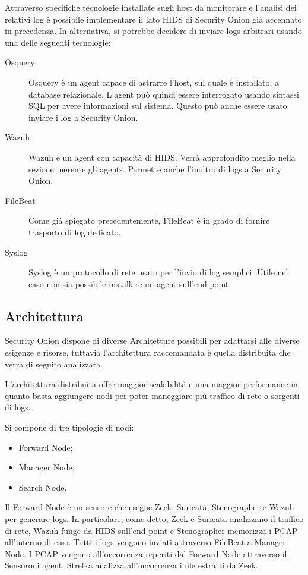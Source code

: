 Attraverso specifiche tecnologie installate sugli host da monitorare e l'analisi dei relativi log è possibile implementare il lato HIDS di Security Onion già accennato in precedenza.
In alternativa, si potrebbe decidere di inviare logs arbitrari usando una delle seguenti tecnologie:
\begin{description}
    \item[Osquery] Osquery \cite{osquery} è un agent  capace di astrarre l'host, sul quale è installato, a database relazionale. L'agent può quindi essere interrogato usando sintassi SQL per avere informazioni sul sistema. Questo può anche essere usato inviare i log a Security Onion.
    \item[Wazuh] Wazuh \cite{wazuh} è un agent con capacità di HIDS. Verrà approfondito meglio nella sezione inerente gli agents. Permette anche l'inoltro di logs a Security Onion.
    \item[FileBeat] Come già spiegato precedentemente, FileBeat \cite{filebeat} è in grado di fornire trasporto di log dedicato.
    \item [Syslog] Syslog \cite{syslog} è un protocollo di rete usato per l'invio di log semplici. Utile nel caso non sia possibile installare un agent sull'end-point.
\end{description}

\subsection{Architettura}
Security Onion dispone di diverse Architetture possibili per adattarsi alle diverse esigenze e risorse, tuttavia l'architettura raccomandata è quella distribuita che verrà di seguito analizzata.

L'architettura distribuita offre maggior scalabilità e una maggior performance in quanto basta aggiungere nodi per poter maneggiare più traffico di rete o sorgenti di logs.

Si compone di  tre tipologie di nodi:
\begin{itemize}
    \item Forward Node;
    \item Manager Node;
    \item Search Node.
\end{itemize}

\vspace{5mm}
Il Forward Node è un sensore che esegue Zeek, Suricata, Stenographer e Wazuh per generare logs. In particolare, come detto, Zeek e Suricata analizzano il traffico di rete, Wazuh funge da HIDS sull'end-point e Stenographer memorizza i PCAP all'interno di esso. Tutti i logs vengono inviati attraverso FileBeat a Manager Node. I PCAP vengono all'occorrenza reperiti dal Forward Node attraverso il Sensoroni agent.
Strelka analizza all'occorrenza i file estratti da Zeek.

